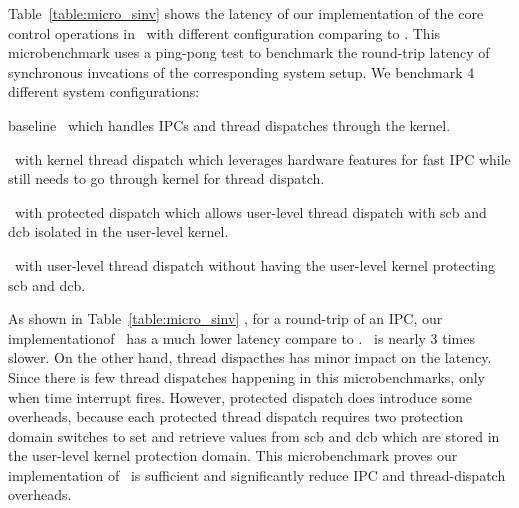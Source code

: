 
Table~\ref{table:micro_sinv} shows the latency of our implementation of the core control operations in \name\ with different configuration comparing to \cos .
This microbenchmark uses a ping-pong test to benchmark the round-trip latency of synchronous invcations of the corresponding system setup.
We benchmark 4 different system configurations:
\begin{inparaenum}[(1)]
\item baseline \cos\ which handles IPCs and thread dispatches through the kernel.
\item \name\ with kernel thread dispatch which leverages hardware features for fast IPC while still needs to go through kernel for thread dispatch.
\item \name\ with protected dispatch which allows user-level thread dispatch with scb and dcb isolated in the user-level kernel.
\item \name\ with user-level thread dispatch without having the user-level kernel protecting scb and dcb.
\end{inparaenum}

As shown in Table~\ref{table:micro_sinv} , for a round-trip of an IPC, our implementationof \name\ has a much lower latency compare to \cos .
\cos\ is nearly 3 times slower.
On the other hand, thread dispacthes has minor impact on the latency.
Since there is few thread dispatches happening in this microbenchmarks, only when time interrupt fires.
However, protected dispatch does introduce some overheads, because each protected thread dispatch requires two protection domain switches to set and retrieve values from scb and dcb which are stored in the user-level kernel protection domain.
This microbenchmark proves our implementation of \name\ is sufficient and significantly reduce IPC and thread-dispatch overheads.

